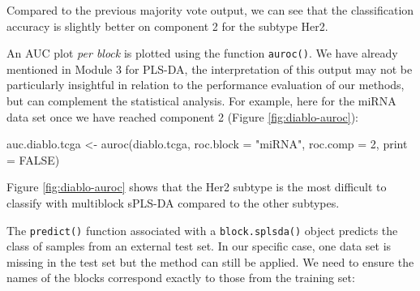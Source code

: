 \documentclass[
]{book}
\newenvironment{Shaded}{\begin{snugshade}}{\end{snugshade}}
\newcommand{\AttributeTok}[1]{\textcolor[rgb]{0.77,0.63,0.00}{#1}}
\newcommand{\CommentTok}[1]{\textcolor[rgb]{0.56,0.35,0.01}{\textit{#1}}}
\newcommand{\ConstantTok}[1]{\textcolor[rgb]{0.00,0.00,0.00}{#1}}
\newcommand{\DecValTok}[1]{\textcolor[rgb]{0.00,0.00,0.81}{#1}}
\newcommand{\FunctionTok}[1]{\textcolor[rgb]{0.00,0.00,0.00}{#1}}
\newcommand{\NormalTok}[1]{#1}
\newcommand{\OtherTok}[1]{\textcolor[rgb]{0.56,0.35,0.01}{#1}}
\newcommand{\SpecialCharTok}[1]{\textcolor[rgb]{0.00,0.00,0.00}{#1}}
\newcommand{\StringTok}[1]{\textcolor[rgb]{0.31,0.60,0.02}{#1}}
\begin{document}
Compared to the previous majority vote output, we can see that the classification accuracy is slightly better on component 2 for the subtype Her2.

An AUC plot \emph{per block} is plotted using the function \texttt{auroc()}. We have already mentioned in Module 3 for PLS-DA, the interpretation of this output may not be particularly insightful in relation to the performance evaluation of our methods, but can complement the statistical analysis. For example, here for the miRNA data set once we have reached component 2 (Figure \ref{fig:diablo-auroc}):

\begin{Shaded}
\begin{Highlighting}[]
\NormalTok{auc.diablo.tcga }\OtherTok{\textless{}{-}} \FunctionTok{auroc}\NormalTok{(diablo.tcga, }\AttributeTok{roc.block =} \StringTok{"miRNA"}\NormalTok{, }\AttributeTok{roc.comp =} \DecValTok{2}\NormalTok{,}
                   \AttributeTok{print =} \ConstantTok{FALSE}\NormalTok{)}
\end{Highlighting}
\end{Shaded}



Figure \ref{fig:diablo-auroc} shows that the Her2 subtype is the most difficult to classify with multiblock sPLS-DA compared to the other subtypes.

The \texttt{predict()} function associated with a \texttt{block.splsda()} object predicts the class of samples from an external test set. In our specific case, one data set is missing in the test set but the method can still be applied. We need to ensure the names of the blocks correspond exactly to those from the training set:

\begin{Shaded}
\end{Shaded}
\end{document}
